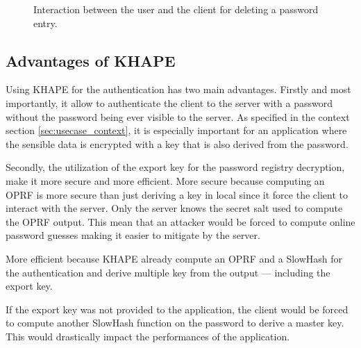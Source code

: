 \documentclass[../report.tex]{subfiles}
\begin{document}
\begin{figure}[h]
 \centering

 \setlength{\fboxsep}{10pt}
 \setlength{\fboxrule}{1pt}

 \caption{Interaction between the user and the client for deleting a password entry.}
 \label{fig:usecase_delete}
\end{figure}

\subsection{Advantages of KHAPE}
Using KHAPE for the authentication has two main advantages.
Firstly and most importantly, it allow to authenticate the client to the server with a password without the password being ever visible to the server. As specified in the context section \ref{sec:usecase_context}, it is especially important for an application where the sensible data is encrypted with a key that is also derived from the password.

Secondly, the utilization of the export key for the password registry decryption, make it more secure and more efficient.
More secure because computing an OPRF is more secure than just deriving a key in local since it force the client to interact with the server. Only the server knows the secret salt used to compute the OPRF output. 
This mean that an attacker would be forced to compute online password guesses making it easier to mitigate by the server.

More efficient because KHAPE already compute an OPRF and a SlowHash for the authentication and derive multiple key from the output --- including the export key.

If the export key was not provided to the application, the client would be forced to compute another SlowHash function on the password to derive a master key. This would drastically impact the performances of the application.
\end{document}
